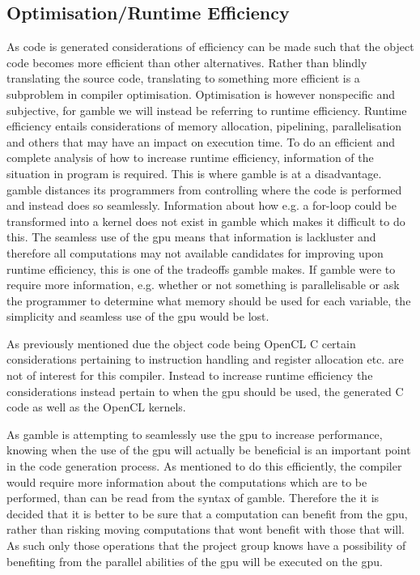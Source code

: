 \subsection*{Optimisation/Runtime Efficiency}
As code is generated considerations of efficiency can be made such that the object code becomes more efficient than other alternatives.
Rather than blindly translating the source code, translating to something more efficient is a subproblem in compiler optimisation.
Optimisation is however nonspecific and subjective, for \gls{gamble} we will instead be referring to runtime efficiency.
Runtime efficiency entails considerations of memory allocation, pipelining, parallelisation and others that may have an impact on execution time.
To do an efficient and complete analysis of how to increase runtime efficiency, information of the situation in program is required.
This is where \gls{gamble} is at a disadvantage. 
\gls{gamble} distances its programmers from controlling where the code is performed and instead does so seamlessly.
Information about how e.g. a for-loop could be transformed into a kernel does not exist in \gls{gamble} which makes it difficult to do this.
The seamless use of the \acrshort{gpu} means that information is lackluster and therefore all computations may not available candidates for improving upon runtime efficiency, this is one of the tradeoffs \gls{gamble} makes.
If \gls{gamble} were to require more information, e.g. whether or not something is parallelisable or ask the programmer to determine what memory should be used for each variable, the simplicity and seamless use of the \acrshort{gpu} would be lost.

As previously mentioned due the object code being OpenCL C certain considerations pertaining to instruction handling and register allocation etc. are not of interest for this compiler.
Instead to increase runtime efficiency the considerations instead pertain to when the \acrshort{gpu} should be used, the generated C code as well as the OpenCL kernels.

As \gls{gamble} is attempting to seamlessly use the \acrshort{gpu} to increase performance, knowing when the use of the \acrshort{gpu} will actually be beneficial is an important point in the code generation process.
As mentioned to do this efficiently, the compiler would require more information about the computations which are to be performed, than can be read from the syntax of \gls{gamble}.
Therefore the it is decided that it is better to be sure that a computation can benefit from the \acrshort{gpu}, rather than risking moving computations that wont benefit with those that will.
As such only those operations that the project group knows have a possibility of benefiting from the parallel abilities of the \acrshort{gpu} will be executed on the \acrshort{gpu}.

